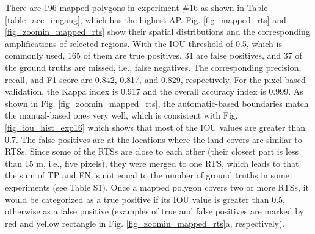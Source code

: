 \documentclass[preprint,12pt,authoryear]{elsarticle}
\begin{document}
There are 196 mapped polygons in experiment \#16 as shown in Table \ref{table_acc_imgaug}, which has the highest AP.  Fig. \ref{fig_mapped_rts} and \ref{fig_zoomin_mapped_rts} show their spatial distributions and the corresponding ampliﬁcations of selected regions. With the IOU threshold of 0.5, which is commonly used, 165 of them are true positives, 31 are false positives, and 37 of the ground truths are missed, i.e., false negatives. The corresponding precision, recall, and F1 score are 0.842, 0.817, and 0.829, respectively. For the pixel-based validation, the Kappa index is 0.917 and the overall accuracy index is 0.999. As shown in Fig. \ref{fig_zoomin_mapped_rts}, the automatic-based boundaries match the manual-based ones very well, which is consistent with Fig. \ref{fig_iou_hist_exp16} which shows that most of the IOU values are greater than 0.7. The false positives are at the locations where the land covers are similar to RTSs. Since some of the RTSs are close to each other (their closest part is less than 15 m, i.e., five pixels), they were merged to one RTS,
which leads to that the sum of TP and FN is not equal to the number of ground truths in some experiments (see Table S1). Once a mapped polygon covers two or more RTSs, it would be categorized as a true positive if its IOU value is greater than 0.5, otherwise as a false positive (examples of true and false positives are marked by red and yellow rectangle in Fig. \ref{fig_zoomin_mapped_rts}a, respectively). 

\end{document}
